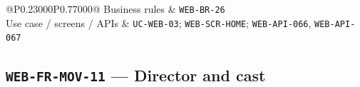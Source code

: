 \begin{longtable}{@{}P{0.23000\SRSWidth}P{0.77000\SRSWidth}@{}}
Business rules & \texttt{WEB-\allowbreak{}BR-\allowbreak{}26} \\[3pt]
Use case /\allowbreak{} screens /\allowbreak{} APIs & \texttt{UC-\allowbreak{}WEB-\allowbreak{}03}; \texttt{WEB-\allowbreak{}SCR-\allowbreak{}HOME}; \texttt{WEB-\allowbreak{}API-\allowbreak{}066}, \texttt{WEB-\allowbreak{}API-\allowbreak{}067} \\[3pt]
\end{longtable}
\endgroup

\subsection{\texttt{WEB-\allowbreak{}FR-\allowbreak{}MOV-\allowbreak{}11} — Director and cast}
\begingroup
\fontsize{9.5}{12}\selectfont
\setlength{\SRSWidth}{\dimexpr\linewidth-2\tabcolsep\relax}
